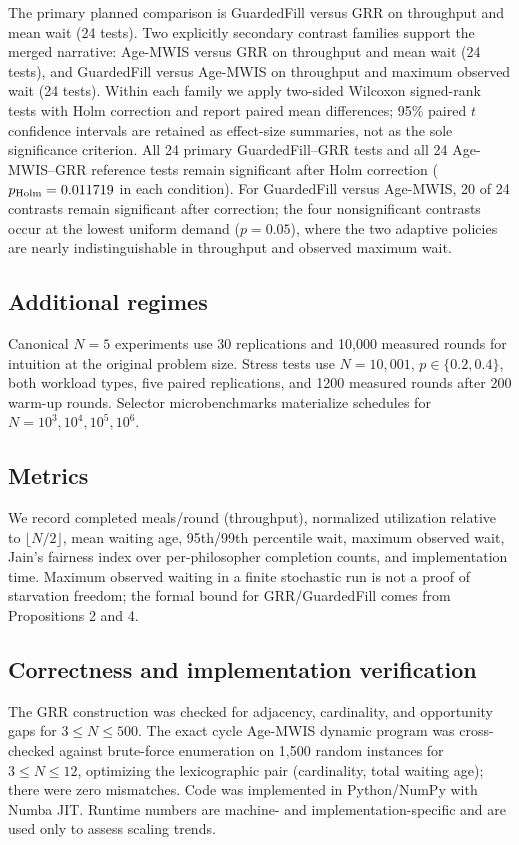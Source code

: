 \documentclass[10pt,journal]{IEEEtran}
\begin{document}
The primary planned comparison is GuardedFill versus GRR on throughput and mean wait (24 tests). Two explicitly secondary contrast families support the merged narrative: Age-MWIS versus GRR on throughput and mean wait (24 tests), and GuardedFill versus Age-MWIS on throughput and maximum observed wait (24 tests). Within each family we apply two-sided Wilcoxon signed-rank tests with Holm correction and report paired mean differences; 95\% paired $t$ confidence intervals are retained as effect-size summaries, not as the sole significance criterion. All 24 primary GuardedFill--GRR tests and all 24 Age-MWIS--GRR reference tests remain significant after Holm correction ($p_{\rm Holm}=0.011719$ in each condition). For GuardedFill versus Age-MWIS, 20 of 24 contrasts remain significant after correction; the four nonsignificant contrasts occur at the lowest uniform demand ($p=0.05$), where the two adaptive policies are nearly indistinguishable in throughput and observed maximum wait.

\subsection{Additional regimes}
Canonical $N=5$ experiments use 30 replications and 10,000 measured rounds for intuition at the original problem size. Stress tests use $N=10{,}001$, $p\in\{0.2,0.4\}$, both workload types, five paired replications, and 1200 measured rounds after 200 warm-up rounds. Selector microbenchmarks materialize schedules for $N=10^3,10^4,10^5,10^6$.

\subsection{Metrics}
We record completed meals/round (throughput), normalized utilization relative to $\lfloor N/2\rfloor$, mean waiting age, 95th/99th percentile wait, maximum observed wait, Jain's fairness index over per-philosopher completion counts, and implementation time. Maximum observed waiting in a finite stochastic run is not a proof of starvation freedom; the formal bound for GRR/GuardedFill comes from Propositions 2 and 4.

\subsection{Correctness and implementation verification}
The GRR construction was checked for adjacency, cardinality, and opportunity gaps for $3\le N\le500$. The exact cycle Age-MWIS dynamic program was cross-checked against brute-force enumeration on 1,500 random instances for $3\le N\le12$, optimizing the lexicographic pair (cardinality, total waiting age); there were zero mismatches. Code was implemented in Python/NumPy with Numba JIT. Runtime numbers are machine- and implementation-specific and are used only to assess scaling trends.
\end{document}
